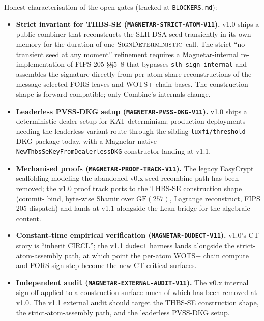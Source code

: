 Honest characterisation of the open gates (tracked at
\texttt{BLOCKERS.md}):
\begin{itemize}[leftmargin=2em,nosep]
  \item \textbf{Strict invariant for THBS-SE
        (\texttt{MAGNETAR-STRICT-ATOM-V11}).} v1.0 ships a public
        combiner that reconstructs the SLH-DSA seed transiently
        in its own memory for the duration of one
        $\textsc{SignDeterministic}$ call. The strict
        ``no transient seed at any moment'' refinement requires a
        Magnetar-internal re-implementation of FIPS 205
        \S\S 5--8 that bypasses \texttt{slh\_sign\_internal} and
        assembles the signature directly from per-atom share
        reconstructions of the message-selected FORS leaves and
        WOTS+ chain bases. The construction shape is
        forward-compatible; only Combine's internals change.
  \item \textbf{Leaderless PVSS-DKG setup
        (\texttt{MAGNETAR-PVSS-DKG-V11}).} v1.0 ships a
        deterministic-dealer setup for KAT determinism;
        production deployments needing the leaderless variant
        route through the sibling \texttt{luxfi/threshold} DKG
        package today, with a Magnetar-native
        \texttt{NewThbsSeKeyFromDealerlessDKG} constructor
        landing at v1.1.
  \item \textbf{Mechanised proofs
        (\texttt{MAGNETAR-PROOF-TRACK-V11}).} The legacy
        EasyCrypt scaffolding modeling the abandoned v0.x
        seed-recombine path has been removed; the v1.0 proof
        track ports to the THBS-SE construction shape (commit-
        bind, byte-wise Shamir over $\mathrm{GF}(257)$, Lagrange
        reconstruct, FIPS 205 dispatch) and lands at v1.1
        alongside the Lean bridge for the algebraic content.
  \item \textbf{Constant-time empirical verification
        (\texttt{MAGNETAR-DUDECT-V11}).} v1.0's CT story is
        ``inherit CIRCL''; the v1.1 \texttt{dudect} harness lands
        alongside the strict-atom-assembly path, at which point
        the per-atom WOTS+ chain compute and FORS sign step
        become the new CT-critical surfaces.
  \item \textbf{Independent audit
        (\texttt{MAGNETAR-EXTERNAL-AUDIT-V11}).} The v0.x
        internal sign-off applied to a construction surface much
        of which has been removed at v1.0. The v1.1 external
        audit should target the THBS-SE construction shape, the
        strict-atom-assembly path, and the leaderless PVSS-DKG
        setup.
\end{itemize}

